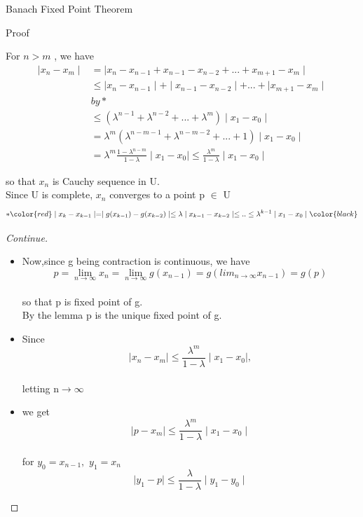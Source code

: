 \documentclass{beamer}
\begin{document}
\begin{frame}{Banach Fixed Point Theorem}

\begin{block}{Proof}

For $n > m$ , we have
\begin{align*}
\mid x_n-x_m\mid&=\mid x_n-x_{n-1}+x_{n-1}-x_{n-2}+...+x_{m+1}-x_{m}\mid\\
&\le\mid x_n-x_{n-1}\mid + \mid x_{n-1}-x_{n-2}\mid+...+\mid x_{m+1}-x_{m}\mid\\
&by  *\\
&\le(\lambda^{n-1}+\lambda^{n-2}+...+\lambda^{m})\mid x_1-x_0\mid\\
&=\lambda^{m}(\lambda^{n-m-1}+\lambda^{n-m-2}+...+1)\mid x_1-x_0\mid\\
&=\lambda^{m}\frac{1-\lambda^{n-m}}{1-\lambda}\mid x_1-x_0\mid\le \frac{\lambda^m}{1-\lambda}\mid x_1-x_0\mid
 \end{align*}
 
 so that ${x_n}$ is Cauchy sequence in U.
 \\Since U is complete, ${x_n}$ converges to a point p $\in$ U
$$*\color{red}\mid x_k-x_{k-1}\mid=\mid g(x_{k-1})-g(x_{k-2})\mid\le\lambda\mid x_{k-1}-x_{k-2}\mid\le..\le\lambda^{k-1}\mid x_1-x_0\mid\color{black}$$

\end{block}

\vskip 1cm

\end{frame}


\begin{frame}
\begin{proof}[Continue]
\begin{itemize}

\item[]<1->Now,since g being contraction is continuous, we have 
$$p=\lim_{n\to\infty}x_{n}=\lim_{n\to\infty}g(x_{n-1})=g(lim_{n\to\infty}x_{n-1})=g(p)$$
 \\so that p is fixed point of g.
 \\By the lemma p is the unique fixed point of g.
 \item[]<2->Since $$\mid x_n-x_m\mid\le \frac{\lambda^m}{1-\lambda}\mid x_1-x_0\mid,$$
 \\letting n$\rightarrow\infty$
 \item[]<3->we get $$\mid p-x_m\mid\le \frac{\lambda^m}{1-\lambda}\mid x_1-x_0\mid$$ 
 \\for $y_0=x_{n-1},$ $y_1= x_n$
$$\mid y_1- p\mid \le \frac{\lambda}{1-\lambda}\mid y_1-y_0\mid$$
 \end{itemize}
 \end{proof}
\vskip 1cm

\end{frame}
\end{document}
